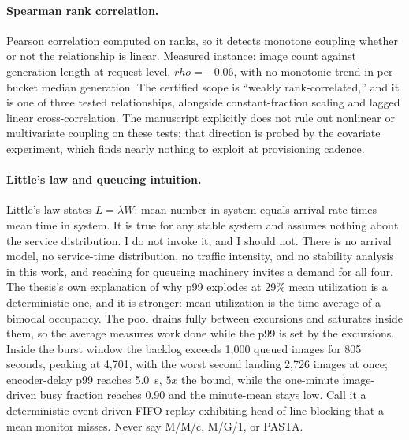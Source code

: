 \documentclass[11pt,a4paper]{article}
\def\times{x}\def\rho{rho}\def\approx{~}\def\leq{<=}\def\geq{>=}%
\def\emph#1{#1}\def\texttt#1{#1}%
\begin{document}
\paragraph{Spearman rank correlation.} Pearson correlation computed on ranks,
so it detects monotone coupling whether or not the relationship is linear.
Measured instance: image count against generation length at request level,
$\rho = -0.06$, with no monotonic trend in per-bucket median generation. The
certified scope is ``weakly rank-correlated,'' and it is one of \emph{three}
tested relationships, alongside constant-fraction scaling and lagged linear
cross-correlation. The manuscript explicitly does not rule out nonlinear or
multivariate coupling on these tests; that direction is probed by the
covariate experiment, which finds nearly nothing to exploit at provisioning
cadence.

\paragraph{Little's law and queueing intuition.} Little's law states
$L = \lambda W$: mean number in system equals arrival rate times mean time in
system. It is true for any stable system and assumes nothing about the
service distribution. \emph{I do not invoke it, and I should not.} There is
no arrival model, no service-time distribution, no traffic intensity, and no
stability analysis in this work, and reaching for queueing machinery invites
a demand for all four. The thesis's own explanation of why p99 explodes at
29\% mean utilization is a deterministic one, and it is stronger: mean
utilization is the time-average of a \emph{bimodal} occupancy. The pool
drains fully between excursions and saturates inside them, so the average
measures work done while the p99 is set by the excursions. Inside the burst
window the backlog exceeds 1{,}000 queued images for 805 seconds, peaking at
4{,}701, with the worst second landing 2{,}726 images at once; encoder-delay
p99 reaches \SI{5.0}{\second}, $5\times$ the bound, while the one-minute
image-driven busy fraction reaches 0.90 and the minute-mean stays low. Call
it a deterministic event-driven FIFO replay exhibiting head-of-line blocking
that a mean monitor misses. Never say M/M/c, M/G/1, or PASTA.
\end{document}
